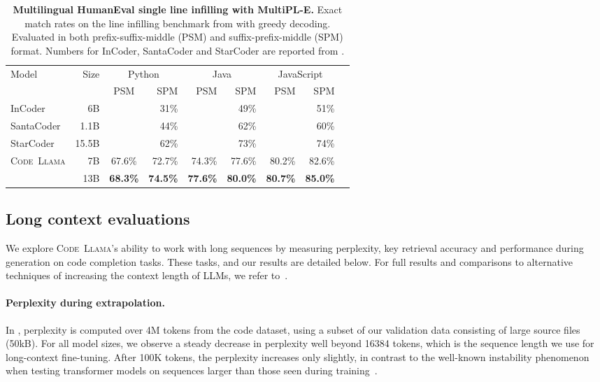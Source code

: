 \documentclass[10pt]{article}
\newcommand{\model}{\textsc{Code~Llama}\xspace}
\newcommand*{\acc}[1]{\num[round-mode=places,round-precision=1]{#1}\%}
\begin{document}
\begin{table}[t!]
    \center
    \setlength{\tabcolsep}{3pt}
    \begin{tabular}{lrcrrrrrr}
    \toprule
    Model & Size & \multicolumn{2}{c}{Python} &\multicolumn{2}{c}{Java} & \multicolumn{2}{c}{JavaScript}  \\ 
    && PSM & SPM & PSM & SPM & PSM & SPM\\
    \midrule
    InCoder &6B && \acc{31} & & \acc{49} & & \acc{51} &  \\
    SantaCoder &1.1B && \acc{44} & & \acc{62} & & \acc{60} & \\
    StarCoder &15.5B && \acc{62} & & \acc{73} & & \acc{74} & \\
    \midrule
    \multirow{ 2}{*}{\model} & 7B & \acc{67.6} & \acc{72.7} & \acc{74.3} & \acc{77.6} & \acc{80.2} & \acc{82.6} \\
    \cmidrule{2-9}
    & 13B & \textbf{\acc{68.3}} & \textbf{\acc{74.5}} & \textbf{\acc{77.6}} & \textbf{\acc{80.0}} & \textbf{\acc{80.7}} & \textbf{\acc{85.0}} \\
    \bottomrule
    \end{tabular}
    \caption{\textbf{Multilingual HumanEval single line infilling with MultiPL-E.} Exact match rates on the line infilling benchmark from \citet{allal2023santacoder} with greedy decoding. Evaluated in both prefix-suffix-middle (PSM) and suffix-prefix-middle (SPM) format. Numbers for InCoder, SantaCoder and StarCoder are reported from \citet{li2023starcoder}.}
    \label{tab:he-fim-santa}
\end{table}
 
\subsection{Long context evaluations}
\label{sec:results-lcft}
We explore \model's ability to work with long sequences by measuring perplexity, key retrieval accuracy and performance during generation on code completion tasks. These tasks, and our results are detailed below. 
For full results and comparisons to alternative techniques of increasing the context length of LLMs, we refer to~.

\paragraph{Perplexity during extrapolation.} In , perplexity is computed over 4M tokens from the code dataset, using a subset of our validation data consisting of large source files (50kB).
For all model sizes, we observe a steady decrease in perplexity well beyond 16384 tokens, which is the sequence length we use for long-context fine-tuning.
After 100K tokens, the perplexity increases only slightly, in contrast to the well-known instability phenomenon when testing transformer models on sequences larger than those seen during training~\citep{press2021train}.
\end{document}
